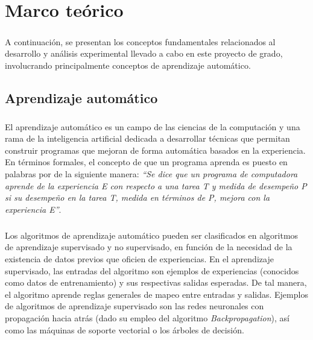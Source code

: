 \chapter{Marco teórico} \label{section-marco-teorico} 

\paragraph{} A continuación, se presentan los conceptos fundamentales relacionados al desarrollo y análisis experimental llevado a cabo en este proyecto de grado, involucrando principalmente conceptos de aprendizaje automático.

\section{Aprendizaje automático}

\paragraph{}El aprendizaje automático es un campo de las ciencias de la computación y una rama de la inteligencia artificial dedicada a desarrollar técnicas que permitan construir programas que mejoran de forma automática basados en la experiencia.
En términos formales, el concepto de que un programa aprenda es puesto en palabras por \citet{mitchell1997machine} de la siguiente manera: \textit{“Se dice que un programa de computadora aprende de la experiencia E con respecto a una tarea T y medida de desempeño P si su desempeño en la tarea T, medida en términos de P, mejora con la experiencia E”}. 

\paragraph{}Los algoritmos de aprendizaje automático pueden ser clasificados en algoritmos de aprendizaje supervisado y no supervisado, en función de la necesidad de la existencia de datos previos que oficien de experiencias.
En el aprendizaje supervisado, las entradas del algoritmo son ejemplos de experiencias (conocidos como datos de entrenamiento) y sus respectivas salidas esperadas.
De tal manera, el algoritmo aprende reglas generales de mapeo entre entradas y salidas.
Ejemplos de algoritmos de aprendizaje supervisado son las redes neuronales con propagación hacia atrás (dado su empleo del algoritmo \textit{Backpropagation}), así como las máquinas de soporte vectorial o los árboles de decisión. 


